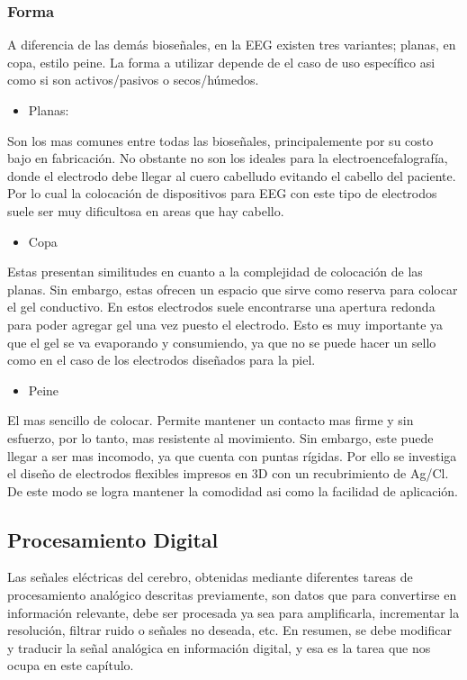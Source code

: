 \documentclass[11pt]{article}
\begin{document}
\subsubsection{Forma}
\label{sec:orgf743e25}
A diferencia de las demás bioseñales, en la EEG existen tres variantes; planas, en copa, estilo peine. La forma a utilizar depende de el caso de uso específico asi como si son activos/pasivos o secos/húmedos.

\begin{itemize}
\item Planas:
\end{itemize}
Son los mas comunes entre todas las bioseñales, principalemente por su costo bajo en fabricación. No obstante no son los ideales para la electroencefalografía, donde el electrodo debe llegar al cuero cabelludo evitando el cabello del paciente. Por lo cual la colocación de dispositivos para EEG con este tipo de electrodos suele ser muy dificultosa en areas que hay cabello.

\begin{itemize}
\item Copa
\end{itemize}
Estas presentan similitudes en cuanto a la complejidad de colocación de las planas. Sin embargo, estas ofrecen un espacio que sirve como reserva para colocar el gel conductivo. En estos electrodos suele encontrarse una apertura redonda para poder agregar gel una vez puesto el electrodo. Esto es muy importante ya que el gel se va evaporando y consumiendo, ya que no se puede hacer un sello como en el caso de los electrodos diseñados para la piel.

\begin{itemize}
\item Peine
\end{itemize}
El mas sencillo de colocar. Permite mantener un contacto mas firme y sin esfuerzo, por lo tanto, mas resistente al movimiento. Sin embargo, este puede llegar a ser mas incomodo, ya que cuenta con puntas rígidas. Por ello se investiga el diseño de electrodos flexibles impresos en 3D con un recubrimiento de Ag/Cl. De este modo se logra mantener la comodidad asi como la facilidad de aplicación.

\subsection{Procesamiento Digital}
\label{sec:org797e382}
Las señales eléctricas del cerebro, obtenidas mediante diferentes tareas de procesamiento analógico descritas previamente, son datos que para convertirse en información relevante, debe ser procesada ya sea para amplificarla, incrementar la resolución, filtrar ruido o señales no deseada, etc. En resumen, se debe modificar y traducir la señal analógica en información digital, y esa es la tarea que nos ocupa en este capítulo.
\end{document}
